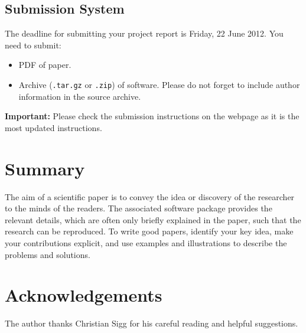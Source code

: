 \documentclass[10pt,conference,compsocconf]{IEEEtran}
\begin{document}
	
	\subsection{Submission System}
	
	The deadline for submitting your project report is Friday, 22 June
	2012.
	You need to submit:
	\begin{itemize}
		\item PDF of paper.
		\item Archive (\texttt{.tar.gz} or \texttt{.zip}) of software. Please
		do not forget to include author information in the source archive.
	\end{itemize}
	
	\textbf{Important:} Please check the submission instructions on the webpage 
	as it is the most updated instructions. 
	
	\section{Summary}
	
	The aim of a scientific paper is to convey the idea or discovery of
	the researcher to the minds of the readers. The associated software
	package provides the relevant details, which are often only briefly
	explained in the paper, such that the research can be reproduced.
	To write good papers, identify your key idea, make your contributions
	explicit, and use examples and illustrations to describe the problems
	and solutions.
	
	\section*{Acknowledgements}
	The author thanks Christian Sigg for his careful reading and helpful
	suggestions.
	
	
	
\end{document}
